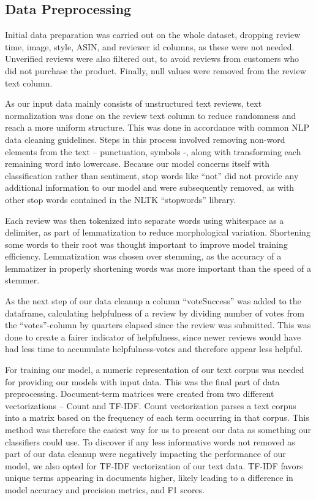 \documentclass[twoside,twocolumn]{article}
\begin{document}
\subsection{Data Preprocessing}
Initial data preparation was carried out on the whole dataset, dropping review time, image, style, ASIN, and reviewer id columns, as these were not needed. Unverified reviews were also filtered out, to avoid reviews from customers who did not purchase the product. Finally, null values were removed from the review text column.

As our input data mainly consists of unstructured text reviews, text normalization was done on the review text column to reduce randomness and reach a more uniform structure. This was done in accordance with common NLP data cleaning guidelines. Steps in this process involved removing non-word elements from the text – punctuation, symbols -, along with transforming each remaining word into lowercase. Because our model concerns itself with classification rather than sentiment, stop words like “not” did not provide any additional information to our model and were subsequently removed, as with other stop words contained in the NLTK “stopwords” library.

Each review was then tokenized into separate words using whitespace as a delimiter, as part of lemmatization to reduce morphological variation. Shortening some words to their root was thought important to improve model training efficiency. Lemmatization was chosen over stemming, as the accuracy of a lemmatizer in properly shortening words was more important than the speed of a stemmer.

As the next step of our data cleanup a column “voteSuccess” was added to the dataframe, calculating helpfulness of a review by dividing number of votes from the “votes”-column by quarters elapsed since the review was submitted. This was done to create a fairer indicator of helpfulness, since newer reviews would have had less time to accumulate helpfulness-votes and therefore appear less helpful.

For training our model, a numeric representation of our text corpus was needed for providing our models with input data. This was the final part of data preprocessing. Document-term matrices were created from two different vectorizations – Count and TF-IDF. Count vectorization parses a text corpus into a matrix based on the frequency of each term occurring in that corpus. This method was therefore the easiest way for us to present our data as something our classifiers could use. To discover if any less informative words not removed as part of our data cleanup were negatively impacting the performance of our model, we also opted for TF-IDF vectorization of our text data. TF-IDF favors unique terms appearing in documents higher, likely leading to a difference in model accuracy and precision metrics, and F1 scores.
\end{document}
